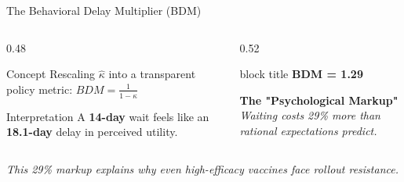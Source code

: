 \documentclass[10pt]{beamer}
\begin{document}
\begin{frame}{The Behavioral Delay Multiplier (BDM)}
    \begin{columns}[T]
        \begin{column}{0.48\textwidth}
            \begin{block}{Concept}
                Rescaling $\hat{\kappa}$ into a transparent policy metric:
                \centering \large $BDM = \frac{1}{1 - \hat{\kappa}}$
            \end{block}
            \vspace{0.3cm}
            \begin{exampleblock}{Interpretation}
                \small A \textbf{14-day} wait feels like an \alert{\textbf{18.1-day}} delay in perceived utility.
            \end{exampleblock}
        \end{column}
        
        \begin{column}{0.52\textwidth}
            \centering
            \begin{beamercolorbox}[sep=1.5em, wd=\linewidth, center]{block title}
                \Huge \alert{\textbf{BDM = 1.29}}
            \end{beamercolorbox}
            \vspace{0.3cm}
            \small \textbf{The "Psychological Markup"} \\
            \textit{Waiting costs 29\% more than rational expectations predict.}
        \end{column}
    \end{columns}
    \vfill
    \centering \textit{This 29\% markup explains why even high-efficacy vaccines face rollout resistance.}
\end{frame}
\end{document}
